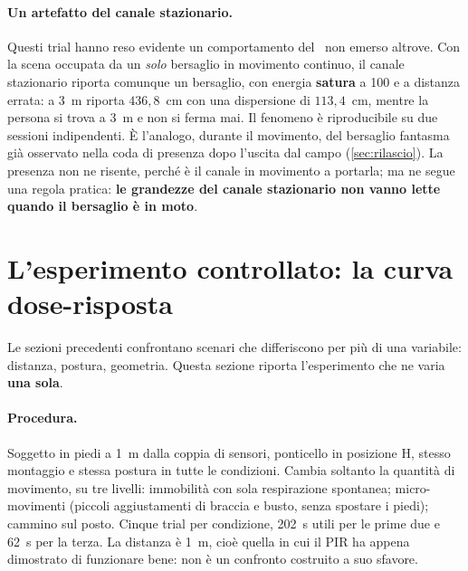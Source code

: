 \paragraph{Un artefatto del canale stazionario.} Questi trial hanno reso evidente un
comportamento del \ldb\ non emerso altrove. Con la scena occupata da un \emph{solo}
bersaglio in movimento continuo, il canale stazionario riporta comunque un bersaglio,
con energia \textbf{satura} a 100 e a distanza errata: a 3~m riporta $436{,}8$~cm con
una dispersione di $113{,}4$~cm, mentre la persona si trova a 3~m e non si ferma mai.
Il fenomeno è riproducibile su due sessioni indipendenti. È l'analogo, durante il
movimento, del bersaglio fantasma già osservato nella coda di presenza dopo l'uscita
dal campo (\cref{sec:rilascio}). La presenza non ne risente, perché è il canale in
movimento a portarla; ma ne segue una regola pratica: \textbf{le grandezze del canale
stazionario non vanno lette quando il bersaglio è in moto}.

\section{L'esperimento controllato: la curva dose-risposta}
\label{sec:dose-risposta}

Le sezioni precedenti confrontano scenari che differiscono per più di una variabile:
distanza, postura, geometria. Questa sezione riporta l'esperimento che ne varia
\textbf{una sola}.

\paragraph{Procedura.} Soggetto in piedi a 1~m dalla coppia di sensori, ponticello in
posizione H, stesso montaggio e stessa postura in tutte le condizioni. Cambia soltanto
la quantità di movimento, su tre livelli: immobilità con sola respirazione spontanea;
micro-movimenti (piccoli aggiustamenti di braccia e busto, senza spostare i piedi);
cammino sul posto. Cinque trial per condizione, 202~s utili per le prime due e 62~s
per la terza. La distanza è 1~m, cioè quella in cui il PIR ha appena dimostrato di
funzionare bene: non è un confronto costruito a suo sfavore.

